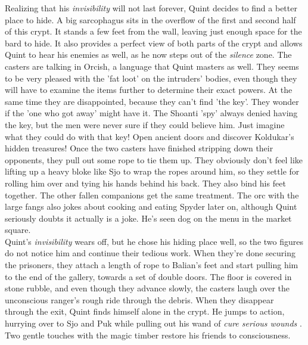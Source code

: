 Realizing that his {\itshape invisibility} will not last forever, Quint decides to find a better place to hide. A big sarcophagus sits in the overflow of the first and second half of this crypt. It stands a few feet from the wall, leaving just enough space for the bard to hide. It also provides a perfect view of both parts of the crypt and allows Quint to hear his enemies as well, as he now steps out of the  {\itshape silence} zone. The casters are talking in Orcish, a language that Quint masters as well. They seems to be very pleased with the 'fat loot' on the intruders' bodies, even though they will have to examine the items further to determine their exact powers. At the same time they are disappointed, because they can't find 'the key'. They wonder if the 'one who got away' might have it. The Shoanti 'spy' always denied having the key, but the men were never sure if they could believe him. Just imagine what they could do with that key! Open ancient doors and discover Koldukar's hidden treasures! Once the two casters have finished stripping down their opponents, they pull out some rope to tie them up. They obviously don't feel like lifting up a heavy bloke like Sjo to wrap the ropes around him, so they settle for rolling him over and tying his hands behind his back. They also bind his feet together. The other fallen companions get the same treatment. The orc with the large fangs also jokes about cooking and eating Spyder later on, although Quint seriously doubts it actually is a joke. He's seen dog on the menu in the market square.\\

Quint's {\itshape invisibility} wears off, but he chose his hiding place well, so the two figures do not notice him and continue their tedious work. When they're done securing the prisoners, they attach a length of rope to Balian's feet and start pulling him to the end of the gallery, towards a set of double doors. The floor is covered in stone rubble, and even though they advance slowly, the casters laugh over the unconscious ranger's rough ride through the debris. When they disappear through the exit, Quint finds himself alone in the crypt. He jumps to action, hurrying over to Sjo and Puk while pulling out his wand of  {\itshape cure serious wounds} . Two gentle touches with the magic timber restore his friends to consciousness. 